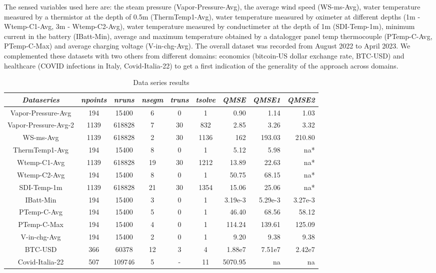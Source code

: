 \documentclass[runningheads]{llncs}
\begin{document}
The sensed variables used here are: the steam pressure (Vapor-Pressure-Avg), the average wind speed (WS-ms-Avg), water temperature measured by a thermistor at the depth of 0.5m (ThermTemp1-Avg), water temperature measured by oximeter at different depths (1m - Wtemp-C1-Avg, 3m - Wtemp-C2-Avg), water temperature measured by conductimeter at the depth of 1m (SDI-Temp-1m), minimum current in the battery (IBatt-Min), average and maximum temperature obtained by a datalogger panel temp thermocouple (PTemp-C-Avg, PTemp-C-Max) and average charging voltage (V-in-chg-Avg). The overall dataset was recorded from August 2022 to April 2023. 
We complemented these datasets with two others from different domains: economics (bitcoin-US dollar exchange rate, BTC-USD) and healthcare (COVID infections in Italy, Covid-Italia-22) to get a first indication of the generality of the approach across domains.

\vspace{-0.8cm}
\begin{table}[ht]
\caption{Data series results}\label{tab:series}%
\begin{tabular}{@{}ccccccrrr}
\toprule
{\it Dataseries}	& {\it npoints} & {\it nruns} & {\it nsegm} & {\it truns} & {\it tsolve} & {\it QMSE} & {\it QMSE1} & {\it QMSE2}\\
\midrule
Vapor-Pressure-Avg   &  194 &  15400 &  6 &  0 &    1 &    0.90 &  1.14 & 1.03\\
Vapor-Pressure-Avg-2 & 1139 & 618828 &  7 & 30 &  832 &    2.85 &  3.26 & 3.32 \\
WS-ms-Avg            & 1139 & 618828 &  2 & 30 & 1136 &     162 &193.03 &210.80 \\
ThermTemp1-Avg       &  194 &  15400 &  8 &  0 &    1 &    5.12 &  5.98 & na* \\
Wtemp-C1-Avg         & 1139 & 618828 & 19 & 30 & 1212 &   13.89 & 22.63 & na* \\
Wtemp-C2-Avg         &  194 &  15400 &  8 &  0 &    1 &   50.75 & 68.15 & na*\\
SDI-Temp-1m          & 1139 & 618828 & 21 & 30 & 1354 &   15.06 & 25.06 & na* \\
IBatt-Min            &  194 &  15400 &  3 &  0 &    1 & 3.19e-3 & 5.29e-3 & 3.27e-3 \\
PTemp-C-Avg          &  194 &  15400 &  5 &  0 &    1 &   46.40 & 68.56 & 58.12 \\
PTemp-C-Max          &  194 &  15400 &  4 &  0 &    1 &  114.24 &139.61 & 125.09 \\
V-in-chg-Avg         &  194 &  15400 &  2 &  0 &    1 &    9.20 &  9.38 & 9.38 \\
BTC-USD              &  366 &  60378 & 12 &  3 &    4 &  1.88e7 &7.51e7 & 2.42e7 \\
Covid-Italia-22      &  507 & 109746 &  5 &  - &   11 & 5070.95 &    na & na \\
\bottomrule
\end{tabular}
\end{table}
\end{document}
